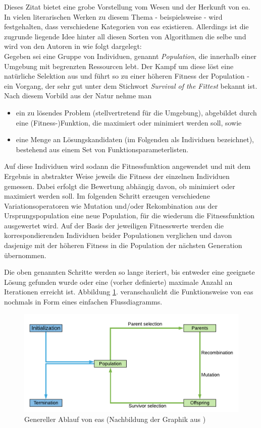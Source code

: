 		Dieses Zitat bietet eine grobe Vorstellung vom Wesen und der Herkunft von \gls{ea}. In vielen literarischen Werken zu diesem Thema - beispielsweise \cite{ger-kla-kru-intro, eib-smi-ea} - wird festgehalten, dass verschiedene Kategorien von \gls{ea}s existieren. Allerdings ist die zugrunde liegende Idee hinter all diesen Sorten von Algorithmen die selbe und wird von den Autoren in \cite{eib-smi-ea} wie folgt dargelegt:\\
		Gegeben sei eine Gruppe von Individuen, genannt \textit{Population}, die innerhalb einer Umgebung mit begrenzten Ressourcen lebt. Der Kampf um diese löst eine natürliche Selektion aus und führt so zu einer höheren Fitness der Population - ein Vorgang, der sehr gut unter dem Stichwort \textit{Survival of the Fittest} bekannt ist. Nach diesem Vorbild aus der Natur nehme man
		\begin{itemize}
			\item ein zu lösendes Problem (stellvertretend für die Umgebung), abgebildet durch eine (Fitness-)Funktion, die maximiert oder minimiert werden soll, sowie
			\item eine Menge an Lösungskandidaten (im Folgenden als Individuen bezeichnet), bestehend aus einem Set von Funktionsparameterlisten.
		\end{itemize}
		Auf diese Individuen wird sodann die Fitnessfunktion angewendet und mit dem Ergebnis in abstrakter Weise jeweils die Fitness der einzelnen Individuen gemessen. Dabei erfolgt die Bewertung abhängig davon, ob minimiert oder maximiert werden soll. Im folgenden Schritt erzeugen verschiedene Variationsoperatoren wie Mutation und/oder Rekombination aus der Ursprungspopulation eine neue Population, für die wiederum die Fitnessfunktion ausgewertet wird. Auf der Basis der jeweiligen Fitnesswerte werden die korrespondierenden Individuen beider Populationen verglichen und davon dasjenige mit der höheren Fitness in die Population der nächsten Generation übernommen.
	
		Die oben genannten Schritte werden so lange iteriert, bis entweder eine geeignete Lösung gefunden wurde oder eine (vorher definierte) maximale Anzahl an Iterationen erreicht ist. Abbildung \ref{fig:ea-flowchart}. veranschaulicht die Funktionsweise von \gls{ea}s nochmals in Form eines einfachen Flussdiagramms.
	
		\begin{figure}[h]
			\centering
			\includegraphics[width=\linewidth]{ea_flowchart}
			\caption[Genereller Ablauf von \gls{ea}s]{Genereller Ablauf von \gls{ea}s (Nachbildung der Graphik aus \cite[Seite 27]{eib-smi-ea})}
			\label{fig:ea-flowchart}
		\end{figure}
	
